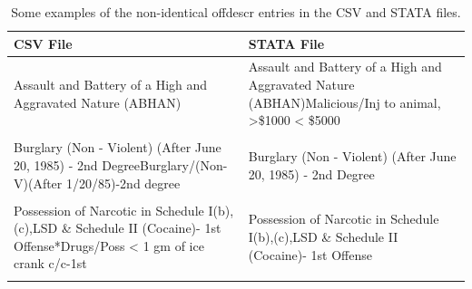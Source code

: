\documentclass[11pt, oneside]{article}   	%
\newcommand{\rowgroup}[1]{\hspace{-1em}#1}
\theoremstyle{ModifiedStyle}
\begin{document}
\begin{table}[H]
	\centering
	\caption{Some examples of the non-identical offdescr entries in the CSV and STATA files.} 
	\vspace{-2mm}
	\setlength\tabcolsep{8pt} %
	{\footnotesize
		\begin{tabular}{L{70mm}L{70mm}}
			\toprule
			CSV File &  STATA File \\
			\midrule
			Assault and Battery of a High and Aggravated Nature (ABHAN) &
			Assault and Battery of a High and Aggravated Nature (ABHAN)Malicious/Inj to animal, >\$1000 < \$5000 \\
			& \\
			Burglary (Non - Violent)  (After June 20, 1985) - 2nd DegreeBurglary/(Non-V)(After 1/20/85)-2nd degree
			& Burglary (Non - Violent)  (After June 20, 1985) - 2nd Degree \\
			& \\
			Possession of Narcotic in Schedule I(b),(c),LSD \& Schedule II (Cocaine)- 1st Offense*Drugs/Poss < 1 gm of ice crank c/c-1st & Possession of Narcotic in Schedule I(b),(c),LSD \& Schedule II (Cocaine)- 1st Offense \\
			& \\
			\bottomrule
		\end{tabular}
	}
	\label{Table_Sentencing_Data_Fields_Offdescr}
\end{table}	
\end{document}
